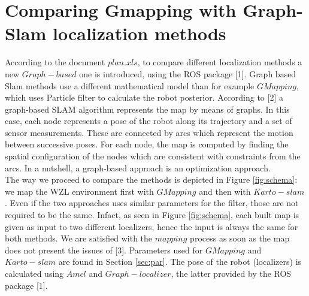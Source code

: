\documentclass[11pt,a4paper]{article}
\begin{document}

%
%



\section{Comparing Gmapping with Graph-Slam localization methods} \label{sec:comp}

According to the document $plan.xls$, to compare different localization methods a new $Graph-based$ one is introduced, using the ROS package [1]. Graph based Slam methods use a different mathematical model than for example $GMapping$, which uses Particle filter to calculate the robot posterior. According to [2] a graph-based SLAM algorithm represents the map by means of graphs. In this case, each node represents a pose of the robot along its trajectory and a set of sensor measurements. These are connected by arcs which represent the motion between successive poses. For each node, the map is computed by finding the spatial configuration of the nodes which are consistent with constraints from the arcs. In a nutshell, a graph-based approach is an optimization approach. \\
The way we proceed to compare the methods is depicted in Figure \ref{fig:schema}: we map the WZL environment first with $GMapping$ and then with $Karto-slam$. Even if the two approaches uses similar parameters for the filter, those are not required to be the same. Infact, as seen in Figure  \ref{fig:schema}, each built map is given as input to two different localizers, hence the input is always the same for both methods. We are satisfied with the $mapping$ process as soon as the map does not present the issues of [3]. Parameters used for $GMapping$ and $Karto-slam$ are found in Section \ref{sec:par}. The pose of the robot (localizers) is calculated using $Amcl$ and $Graph-localizer$, the latter provided by the ROS package [1].
\end{document}
